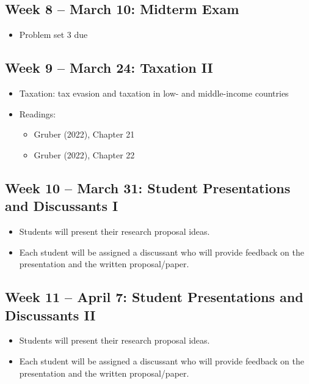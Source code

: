 \documentclass[11pt]{article}
\begin{document}
\subsection*{Week 8 -- March 10: Midterm Exam}
\begin{itemize}
    \item Problem set 3 due
\end{itemize}

\subsection*{Week 9 -- March 24: Taxation II}
\begin{itemize}
    \setlength{\itemsep}{0em}
    \item Taxation: tax evasion and taxation in low- and middle-income countries
    \item Readings:
    \begin{itemize}
        \item Gruber (2022), Chapter 21
        \item Gruber (2022), Chapter 22
    \end{itemize}
\end{itemize}

\subsection*{Week 10 -- March 31: Student Presentations and Discussants I}

\begin{itemize}
    \setlength{\itemsep}{0em}
    \item Students will present their research proposal ideas.
    \item Each student will be assigned a discussant who will provide feedback on the presentation and the written proposal/paper.
\end{itemize}

\subsection*{Week 11 -- April 7: Student Presentations and Discussants II}
\begin{itemize}
    \setlength{\itemsep}{0em}
    \item Students will present their research proposal ideas.
    \item Each student will be assigned a discussant who will provide feedback on the presentation and the written proposal/paper.
\end{itemize}
\end{document}
